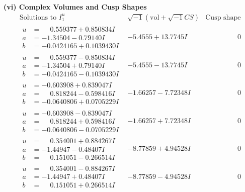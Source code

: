 \documentclass[1p]{elsarticle_modified}
\theoremstyle{definition}
\newcommand{\I}{\sqrt{-1}}
\begin{document}
\newpage\flushleft \textbf{(vi) Complex Volumes and Cusp Shapes}
$$\begin{array}{c|c|c}  
\text{Solutions to }I^u_{1}& \I (\text{vol} + \sqrt{-1}CS) & \text{Cusp shape}\\
 \hline 
\begin{aligned}
u &= \phantom{-}0.559377 + 0.850834 I \\
a &= -1.34504 - 0.79140 I \\
b &= -0.0424165 + 0.1039430 I\end{aligned}
 & -5.4555 + 13.7745 I & \phantom{-0.000000 } 0 \\ \hline\begin{aligned}
u &= \phantom{-}0.559377 - 0.850834 I \\
a &= -1.34504 + 0.79140 I \\
b &= -0.0424165 - 0.1039430 I\end{aligned}
 & -5.4555 - 13.7745 I & \phantom{-0.000000 } 0 \\ \hline\begin{aligned}
u &= -0.603908 + 0.839047 I \\
a &= \phantom{-}0.818244 - 0.598416 I \\
b &= -0.0640806 + 0.0705229 I\end{aligned}
 & -1.66257 - 7.72348 I & \phantom{-0.000000 } 0 \\ \hline\begin{aligned}
u &= -0.603908 - 0.839047 I \\
a &= \phantom{-}0.818244 + 0.598416 I \\
b &= -0.0640806 - 0.0705229 I\end{aligned}
 & -1.66257 + 7.72348 I & \phantom{-0.000000 } 0 \\ \hline\begin{aligned}
u &= \phantom{-}0.354001 + 0.884267 I \\
a &= -1.44947 - 0.48407 I \\
b &= \phantom{-}0.151051 - 0.266514 I\end{aligned}
 & -8.77859 + 4.94528 I & \phantom{-0.000000 } 0 \\ \hline\begin{aligned}
u &= \phantom{-}0.354001 - 0.884267 I \\
a &= -1.44947 + 0.48407 I \\
b &= \phantom{-}0.151051 + 0.266514 I\end{aligned}
 & -8.77859 - 4.94528 I & \phantom{-0.000000 } 0 \\ \hline\begin{aligned}

\end{aligned}
\end{array}$$
\end{document}
